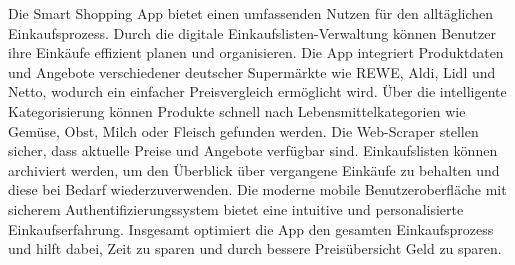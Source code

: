 Die Smart Shopping App bietet einen umfassenden Nutzen für den alltäglichen Einkaufsprozess. Durch die digitale Einkaufslisten-Verwaltung können Benutzer ihre Einkäufe effizient planen und organisieren. Die App integriert Produktdaten und Angebote verschiedener deutscher Supermärkte wie REWE, Aldi, Lidl und Netto, wodurch ein einfacher Preisvergleich ermöglicht wird. Über die intelligente Kategorisierung können Produkte schnell nach Lebensmittelkategorien wie Gemüse, Obst, Milch oder Fleisch gefunden werden. Die Web-Scraper stellen sicher, dass aktuelle Preise und Angebote verfügbar sind. Einkaufslisten können archiviert werden, um den Überblick über vergangene Einkäufe zu behalten und diese bei Bedarf wiederzuverwenden. Die moderne mobile Benutzeroberfläche mit sicherem Authentifizierungssystem bietet eine intuitive und personalisierte Einkaufserfahrung. Insgesamt optimiert die App den gesamten Einkaufsprozess und hilft dabei, Zeit zu sparen und durch bessere Preisübersicht Geld zu sparen.